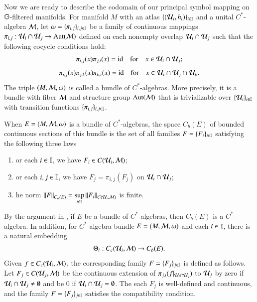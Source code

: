 \documentclass[leqno]{amsart}
\begin{document}
	Now we are ready to describe the codomain of our principal symbol mapping on $\mathbb{G}$-filtered manifolds.
	For manifold $M$ with an atlas $\{({\mathcal U}_{i},h_{i})\}_{i\in\mathbb I}$ and a unital $C^{*}$-algebra ${\mathcal M}$, let $\omega=\{\pi_{i,j}\}_{i,j\in\mathbb I}$ be a family of continuous mappings $\pi_{i,j}:{\mathcal U}_{i}\cap{\mathcal U}_{j}\rightarrow\rm Aut({\mathcal M})$ defined on each nonempty overlap ${\mathcal U}_{i}\cap{\mathcal U}_{j}$ such that the following cocycle conditions hold:
	\begin{align}\label{cocycle-two} 
		\pi_{i,j}(x)\pi_{j,i}(x)={\rm id}\quad \mbox{for}\quad x\in{\mathcal U}_{i}\cap{\mathcal U}_{j};
	\end{align}
	\begin{align}\label{cocycle-three} 
		\pi_{i,j}(x)\pi_{j,k}(x)\pi_{k,i}(x)={\rm id}\quad \mbox{for}\quad x\in{\mathcal U}_{i}\cap{\mathcal U}_{j}\cap{\mathcal U}_{k}.
	\end{align}
	The triple $(M,{\mathcal M},\omega)$ is called a bundle of $C^{*}$-algebras. More precisely, it is a bundle with fiber ${\mathcal M}$ and structure group $\rm Aut({\mathcal M})$ that is trivializable over $\{{\mathcal U}_{i}\}_{i\in\mathbb I}$ with transition functions $\{\pi_{i,j}\}_{i,j\in\mathbb I}$.
	
	
	
	
	When $E=(M,{\mathcal M},\omega)$ is a bundle of $C^{*}$-algebras, the space $C_{b}(E)$ of bounded continuous sections of this bundle is the set of all families $F=\{F_{i}\}_{i\in\mathbb I}$ satisfying the following three laws
	\begin{enumerate}[\rm(i)]
		\item {}or each $i\in\mathbb I$, we have $F_{i}\in C({\mathcal U}_{i},{\mathcal M})$;
		\item {}or each $i,j\in\mathbb I$, we have $F_{j}=\pi_{i,j}(F_{j})$ on ${\mathcal U}_{i}\cap{\mathcal U}_{j}$;
		\item {}he norm $\displaystyle\left\| F \right\|_{C_{b}(E)}=\sup_{i\in\mathbb I}\left\| F_{i} \right\|_{C({\mathcal U}_{i},{\mathcal M})}$ is finite.
	\end{enumerate}
	By the argument in \cite{DAO4}, if $E$ be a bundle of $C^{*}$-algebras, then $C_{b}(E)$ is a $C^{*}$-algebra.
	In addition, for $C^{*}$-algebra bundle $E=(M,{\mathcal M},\omega)$ and each $i\in\mathbb I$, there is a natural embedding 
	\begin{align}\label{natural embedding}
		\Theta_{i}:C_{c}({\mathcal U}_{i},{\mathcal M})\rightarrow C_{b}(E).
	\end{align} 
	Given $f\in C_{c}({\mathcal U}_{i},{\mathcal M})$, the corresponding family $F=\{F_{j}\}_{j\in\mathbb I}$ is defined as follows. Let $F_{j}\in C({\mathcal U}_{j},{\mathcal M})$ be the continuous extension of $\pi_{j,i}(f|_{{\mathcal U}_{i}\cap{\mathcal U}_{j}})$ to ${\mathcal U}_{j}$ by zero if ${\mathcal U}_{i}\cap{\mathcal U}_{j}\neq\emptyset$ and be 0 if ${\mathcal U}_{i}\cap{\mathcal U}_{j}=\emptyset$. The each $F_{j}$ is well-defined and continuous, and the family $F=\{F_{j}\}_{j\in\mathbb I}$ satisfies the compatibility condition. 
	
\end{document}
